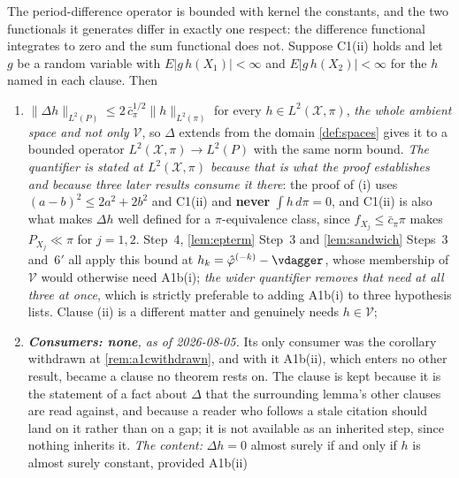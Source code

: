 \begin{lemma}\label{lem:nusigma}
The period-difference operator is bounded with kernel the constants, and the two functionals it generates
differ in exactly one respect: the difference functional integrates to zero and the sum functional does
not.
Suppose C1(ii) holds and let $g$ be a random variable with $E|g\,h(X_1)|<\infty$ and $E|g\,h(X_2)|<\infty$
for the $h$ named in each clause. Then
\begin{enumerate}
\item[(i)] $\|\Delta h\|_{L^{2}(P)}\le2\,\bar c_\pi^{1/2}\|h\|_{L^{2}(\pi)}$ for every
$h\in L^{2}(\mathcal X,\pi)$, \emph{the whole ambient space and not only $\mathcal V$}, so
$\Delta$ extends from the domain \cref{def:spaces} gives it to a bounded operator
$L^{2}(\mathcal X,\pi)\to L^{2}(P)$ with the same norm bound. \emph{The quantifier is stated at
$L^{2}(\mathcal X,\pi)$ because that is what the proof establishes and because three later results
consume it there}: the proof of \textup{(i)} uses $(a-b)^{2}\le2a^{2}+2b^{2}$ and C1(ii) and \textbf{never}
$\int h\,d\pi=0$, and C1(ii) is also what makes $\Delta h$ well defined for a $\pi$-equivalence class, since
$f_{X_j}\le\bar c_\pi\pi$ makes $P_{X_j}\ll\pi$ for $j=1,2$.  Step~4,
\cref{lem:epterm} Step~3 and \cref{lem:sandwich} Steps~3 and~6$'$ all apply this bound at
$h_k=\hat\varphi^{(-k)}-\vdagger$, whose membership of $\mathcal V$ would otherwise need A1b(i);
\emph{the wider quantifier removes that need at all three at once}, which is strictly preferable to
adding A1b(i) to three hypothesis lists.
Clause \textup{(ii)} is a different matter and genuinely needs $h\in\mathcal V$;
\item[(ii)] \emph{\textbf{Consumers: none}, as of 2026-08-05.} Its only consumer was the corollary
withdrawn at \cref{rem:a1cwithdrawn}, and with it A1b(ii), which enters no other result, became
a clause no theorem rests on. The clause is kept because it is the statement of a fact about $\Delta$
that the surrounding lemma's other clauses are read against, and because a reader who follows a stale
citation should land on it rather than on a gap; it is not available as an inherited step, since
nothing inherits it. \emph{The content:} $\Delta h=0$ almost surely if and only if $h$ is almost surely
constant, provided A1b(ii)

\end{enumerate}
\end{lemma}
